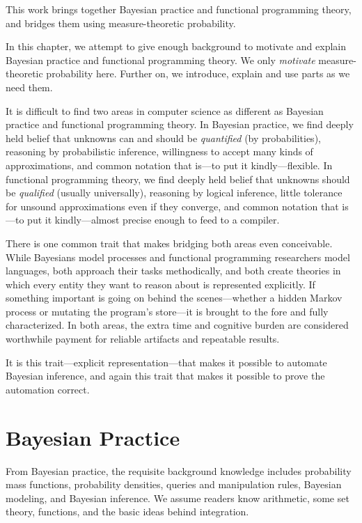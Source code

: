This work brings together Bayesian practice and functional programming theory, and bridges them using measure-theoretic probability.

In this chapter, we attempt to give enough background to motivate and explain Bayesian practice and functional programming theory.
We only \emph{motivate} measure-theoretic probability here.
Further on, we introduce, explain and use parts as we need them.

It is difficult to find two areas in computer science as different as Bayesian practice and functional programming theory.
In Bayesian practice, we find deeply held belief that unknowns can and should be \emph{quantified} (by probabilities), reasoning by probabilistic inference, willingness to accept many kinds of approximations, and common notation that is---to put it kindly---flexible.
In functional programming theory, we find deeply held belief that unknowns should be \emph{qualified} (usually universally), reasoning by logical inference, little tolerance for unsound approximations even if they converge, and common notation that is---to put it kindly---almost precise enough to feed to a compiler.

There is one common trait that makes bridging both areas even conceivable.
While Bayesians model processes and functional programming researchers model languages, both approach their tasks methodically, and both create theories in which every entity they want to reason about is represented explicitly.
If something important is going on behind the scenes---whether a hidden Markov process or mutating the program's store---it is brought to the fore and fully characterized.
In both areas, the extra time and cognitive burden are considered worthwhile payment for reliable artifacts and repeatable results.

It is this trait---explicit representation---that makes it possible to automate Bayesian inference, and again this trait that makes it possible to prove the automation correct.


\section{Bayesian Practice}

From Bayesian practice, the requisite background knowledge includes probability mass functions, probability densities, queries and manipulation rules, Bayesian modeling, and Bayesian inference.
We assume readers know arithmetic, some set theory, functions, and the basic ideas behind integration.

